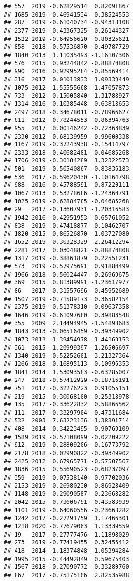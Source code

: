 \documentclass[
]{article}
\begin{document}
\begin{verbatim}
## 557  2019 -0.62829514  0.82091867
## 1685 2019 -0.46941534 -0.38524553
## 287  2019 -0.61040734 -0.94318108
## 2377 2019 -0.43367325 -0.26144327
## 1522 2019 -0.64956620  0.80325621
## 858  2018 -0.57536870  0.49787729
## 1840 2013  1.11035493 -1.16107306
## 576  2015  0.93244842 -0.88870808
## 990  2016  0.92995284 -0.85569414
## 316  2017  0.01013833 -1.09339449
## 1075 2012  1.55555668 -1.47057873
## 733  2012  0.15005840 -1.31788927
## 1314 2016 -0.10385448  0.63818653
## 2497 2018 -0.34678011 -0.78966627
## 811  2012  0.78244553 -0.86394763
## 955  2017  0.00146242 -0.72363839
## 2330 2012  0.68139959 -0.99600338
## 1167 2019 -0.37243938 -0.15414797
## 2333 2018 -0.40682481 -0.04685268
## 1706 2019 -0.30184289  1.32322573
## 501  2019 -0.50540867 -0.83836183
## 536  2017 -0.59620430 -1.10164798
## 988  2016  0.45788591 -0.87220111
## 1067 2013  0.53278686 -1.24360791
## 1025 2019 -0.62884785 -0.04685268
## 29   2017 -0.13607931 -1.20316583
## 1942 2016 -0.42951953 -0.65761052
## 838  2019 -0.47418877 -0.10462707
## 1820 2015  0.86526870 -1.03727080
## 1652 2019 -0.30328329  2.26412294
## 2281 2017  0.03048821 -0.88870808
## 1317 2019 -0.38861879  0.22551231
## 573  2019 -0.57975691  0.91880499
## 1966 2018 -0.56024447 -0.26969675
## 369  2015  0.81389991 -1.23617977
## 86   2017 -0.31557696 -0.45952689
## 1507 2019 -0.71589173  0.36582154
## 2375 2019 -0.51378310 -0.09637358
## 1646 2019 -0.61097680  0.39883548
## 355  2009  2.14494945 -1.54898683
## 1843 2013 -0.06516459 -0.39349902
## 1073 2013  1.39454978 -1.44169153
## 361  2015  1.20999397 -1.26506697
## 1340 2019 -0.52252601  3.21327364
## 1266 2018  0.16895113  0.10996353
## 1841 2014  1.53093583 -0.63285007
## 247  2018 -0.57412929 -0.18716191
## 751  2017 -0.32276223  0.91055151
## 219  2015  0.30068100 -0.25318978
## 135  2017 -0.33622832  0.58866562
## 111  2017 -0.33297904  0.47311684
## 532  2003  7.63223136 -1.38391714
## 408  2014  0.34223495 -0.90769109
## 1589 2019 -0.57108099 -0.02209222
## 912  2019 -0.28809206  0.16773792
## 2178 2018 -0.02990822 -0.39349902
## 2425 2012  0.67965771 -0.57507567
## 1836 2015  0.55690523 -0.68237097
## 359  2019 -0.07538140 -0.97702036
## 2153 2019 -0.26980230  0.86928409
## 1148 2019 -0.29090587 -0.23668282
## 2042 2015  0.73606791 -0.43583939
## 1101 2019 -0.64060556 -0.23668282
## 1242 2017 -0.27291759  1.17466301
## 1218 2020 -0.77679063  1.13339559
## 19   2017 -0.27777476 -1.11898029
## 273  2019 -0.77419455  0.32455412
## 418  2014  1.18374848 -1.05394284
## 1995 2015 -0.44492849  0.59675403
## 1567 2018 -0.27090772  0.33280760
## 867  2017 -0.75175106  2.82535988

\end{verbatim}
\end{document}
